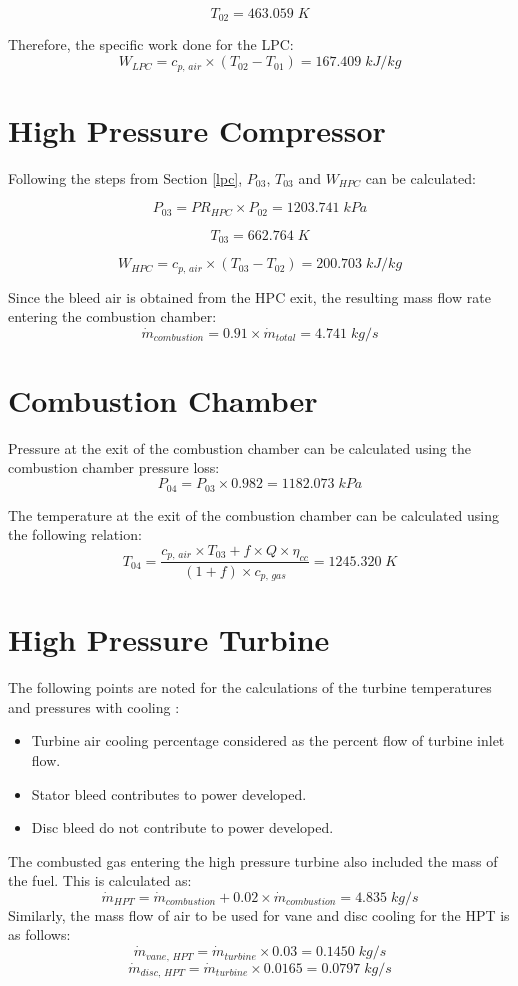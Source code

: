 $$T_{02} = 463.059 \; K$$

Therefore, the specific work done for the LPC:
$$W_{LPC} = c_{p, \, air} \times (T_{02} - T_{01}) = 167.409 \; kJ/kg$$

\section{High Pressure Compressor}

Following the steps from Section \ref{lpc}, $P_{03}$, $T_{03}$ and $W_{HPC}$ can be calculated:

$$P_{03} = PR_{HPC} \times P_{02} = 1203.741 \; kPa$$

$$T_{03} = 662.764 \; K$$

$$W_{HPC} = c_{p, \, air} \times (T_{03} - T_{02}) = 200.703 \; kJ/kg$$

Since the bleed air is obtained from the HPC exit, the resulting mass flow rate entering the combustion chamber:
$$\dot{m}_{combustion} = 0.91 \times \dot{m}_{total} = 4.741 \; kg/s$$

\section{Combustion Chamber}
Pressure at the exit of the combustion chamber can be calculated using the combustion chamber pressure loss:
$$P_{04} = P_{03} \times 0.982 = 1182.073 \; kPa$$

The temperature at the exit of the combustion chamber can be calculated using the following relation:
$$T_{04} = \frac{c_{p, \, air} \times T_{03} + f \times Q \times \eta_{cc}}{(1 + f) \times c_{p, \, gas}} = 1245.320 \; K$$
\clearpage
\section{High Pressure Turbine} \label{hpt_calcs}

The following points are noted for the calculations of the turbine temperatures and pressures with cooling \cite{saravanamuttoo2017}:
\begin{itemize}
  \item Turbine air cooling percentage considered as the percent flow of turbine inlet flow.
  \item Stator bleed contributes to power developed.
  \item Disc bleed do not contribute to power developed.
\end{itemize}

The combusted gas entering the high pressure turbine also included the mass of the fuel. This is calculated as:
$$\dot{m}_{HPT} = \dot{m}_{combustion} + 0.02 \times \dot{m}_{combustion} = 4.835 \; kg/s$$
Similarly, the mass flow of air to be used for vane and disc cooling for the HPT is as follows:
$$\dot{m}_{vane,\, HPT} = \dot{m}_{turbine} \times 0.03 = 0.1450 \; kg/s$$
$$\dot{m}_{disc,\, HPT} = \dot{m}_{turbine} \times 0.0165 = 0.0797 \; kg/s$$


